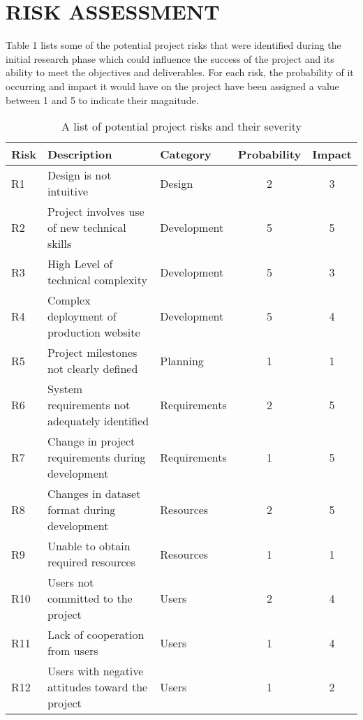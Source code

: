 \newpage
\section{RISK ASSESSMENT \hrulefill}

Table 1 lists some of the potential project risks that were identified during
the initial research phase which could influence the success of the project and
its ability to meet the objectives and deliverables. For each risk, the
probability of it occurring and impact it would have on the project have been
assigned a value between 1 and 5 to indicate their magnitude.

\begin{table}[H]
\centering
\begin{tabular}{ | l | l | l || c | c | }
\hline
Risk & Description & Category & Probability & Impact\\
\hline
R1  & Design is not intuitive                           & Design       & 2 & 3\\
R2  & Project involves use of new technical skills      & Development  & 5 & 5\\
R3  & High Level of technical complexity                & Development  & 5 & 3\\
R4  & Complex deployment of production website          & Development  & 5 & 4\\
R5  & Project milestones not clearly defined            & Planning     & 1 & 1\\
R6  & System requirements not adequately identified     & Requirements & 2 & 5\\
R7  & Change in project requirements during development & Requirements & 1 & 5\\
R8  & Changes in dataset format during development      & Resources    & 2 & 5\\
R9  & Unable to obtain required resources               & Resources    & 1 & 1\\
R10 & Users not committed to the project                & Users        & 2 & 4\\
R11 & Lack of cooperation from users                    & Users        & 1 & 4\\
R12 & Users with negative attitudes toward the project  & Users        & 1 & 2\\
\hline
\end{tabular}
\caption{A list of potential project risks and their severity}
\label{tab:risk-assessment}
\end{table}

